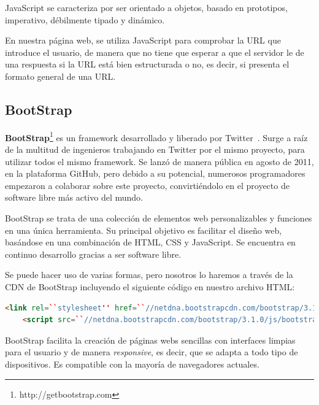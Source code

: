 \documentclass[a4paper, 12pt]{book}
\begin{document}
JavaScript se caracteriza por ser orientado a objetos, basado en prototipos, imperativo, débilmente tipado y dinámico.

En nuestra página web, se utiliza JavaScript para comprobar la URL que introduce el usuario, de manera que no tiene que esperar a que el servidor le de una respuesta si la URL está bien estructurada o no, es decir, si presenta el formato general de una URL.

\subsection{BootStrap}
\label{subsec:bootstrap}
\textbf{BootStrap}\footnote{http://getbootstrap.com} es un framework desarrollado y liberado por Twitter~\cite{cochran2012twitter}. Surge a raíz de la multitud de ingenieros trabajando en Twitter por el mismo proyecto, para utilizar todos el mismo framework. Se lanzó de manera pública en agosto de 2011, en la plataforma GitHub, pero debido a su potencial, numerosos programadores empezaron a colaborar sobre este proyecto, convirtiéndolo en el proyecto de software libre más activo del mundo.

BootStrap se trata de una colección de elementos web personalizables y funciones en una única herramienta. Su principal objetivo es facilitar el diseño web, basándose en una combinación de HTML, CSS y JavaScript. Se encuentra en continuo desarrollo gracias a ser software libre.

Se puede hacer uso de varias formas, pero nosotros lo haremos a través de la CDN de BootStrap incluyendo el siguiente código en nuestro archivo HTML:

  \begin{lstlisting}[basicstyle=\small, language=HTML, breaklines=true]
    <link rel=``stylesheet'' href=``//netdna.bootstrapcdn.com/bootstrap/3.1.0/css/bootstrap.min.css''>
    <script src=``//netdna.bootstrapcdn.com/bootstrap/3.1.0/js/bootstrap.min.js''></script>
  \end{lstlisting}

BootStrap facilita la creación de páginas webs sencillas con interfaces limpias para el usuario y de manera \emph{responsive}, es decir, que se adapta a todo tipo de dispositivos. Es compatible con la mayoría de navegadores actuales.
\end{document}
